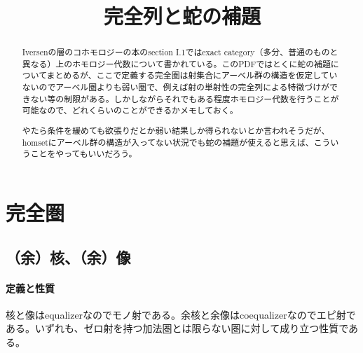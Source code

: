 \documentclass[a4paper,11pt]{jsarticle}
\theoremstyle{definition}
\begin{document}
\date{}
\title{完全列と蛇の補題}

\maketitle

\begin{abstract}
  Iversenの層のコホモロジーの本\cite{iversen2012cohomology}のsection I.1ではexact category（多分、普通のものと異なる）上のホモロジー代数について書かれている。このPDFではとくに蛇の補題についてまとめるが、ここで定義する完全圏は射集合にアーベル群の構造を仮定していないのでアーベル圏よりも弱い圏で、例えば射の単射性の完全列による特徴づけができない等の制限がある。しかしながらそれでもある程度ホモロジー代数を行うことが可能なので、どれくらいのことができるかメモしておく。

  やたら条件を緩めても欲張りだとか弱い結果しか得られないとか言われそうだが、homsetにアーベル群の構造が入ってない状況でも蛇の補題が使えると思えば、こういうことをやってもいいだろう。
\end{abstract}

\tableofcontents

\section{完全圏}
\subsection{（余）核、（余）像}
\paragraph{定義と性質}

核と像はequalizerなのでモノ射である。余核と余像はcoequalizerなのでエピ射である。いずれも、ゼロ射を持つ加法圏とは限らない圏に対して成り立つ性質である。
\end{document}

